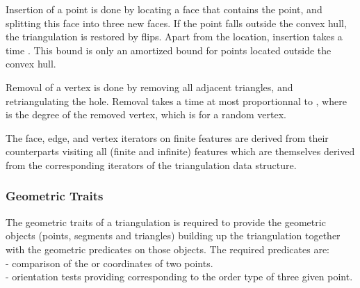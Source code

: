 Insertion of a point is done by locating a face that contains the
point, and splitting this face into three new faces.
If the point falls outside the convex hull, the triangulation
 is restored by flips.  Apart from the location, insertion takes a
time . This bound is only an amortized bound
for points located outside the convex hull.

Removal of a vertex is done by removing all adjacent triangles, and
retriangulating the hole. Removal takes a time  at most proportionnal to
, where
  is the degree of the removed vertex,
which is  for a random vertex.

The face, edge, and vertex iterators on finite features
are derived from their counterparts visiting all (finite and infinite)
features which are themselves derived from the corresponding iterators
of the triangulation data structure.


\subsubsection{ Geometric Traits}
\label{Subsubsection_2D_Triangulation_Basic_Geometric_Traits}

The geometric traits of a triangulation 
 is required to provide
the geometric objects (points, segments and triangles)
building up the triangulation
together with the geometric predicates on those objects.
The required predicates are: \\
- comparison of the  or  coordinates of two points.\\
- orientation tests providing 
  corresponding to the order type of three given point.


